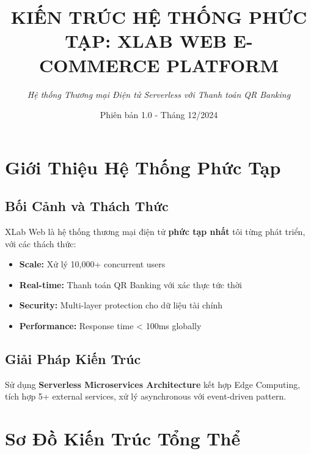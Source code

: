 \documentclass[12pt,a4paper]{article}
\title{\textbf{\Large KIẾN TRÚC HỆ THỐNG PHỨC TẠP: XLAB WEB E-COMMERCE PLATFORM}}
\author{\textit{Hệ thống Thương mại Điện tử Serverless với Thanh toán QR Banking}}
\date{\small Phiên bản 1.0 - Tháng 12/2024}
\begin{document}
\maketitle

\section{Giới Thiệu Hệ Thống Phức Tạp}

\subsection{Bối Cảnh và Thách Thức}
XLab Web là hệ thống thương mại điện tử \textbf{phức tạp nhất} tôi từng phát triển, với các thách thức:
\begin{itemize}
    \item \textbf{Scale:} Xử lý 10,000+ concurrent users
    \item \textbf{Real-time:} Thanh toán QR Banking với xác thực tức thời
    \item \textbf{Security:} Multi-layer protection cho dữ liệu tài chính
    \item \textbf{Performance:} Response time < 100ms globally
\end{itemize}

\subsection{Giải Pháp Kiến Trúc}
Sử dụng \textbf{Serverless Microservices Architecture} kết hợp Edge Computing, tích hợp 5+ external services, xử lý asynchronous với event-driven pattern.

\section{Sơ Đồ Kiến Trúc Tổng Thể}
\end{document}
